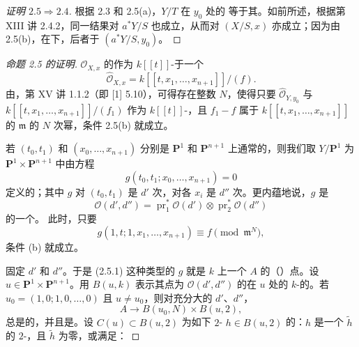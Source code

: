 \begin{proof}[证明 $2.5\Rightarrow2.4$]
根据 2.3 和 2.5(a)，$Y/T$ 在 $y_0$ 处的 等于其。如前所述，根据第 XIII 讲 2.4.2，同一结果对 $a^*Y/S$ 也成立，从而对 $(X/S,x)$ 亦成立；因为由 2.5(b)，在下，后者于 $(a^*Y/S,y_0)$。
\end{proof}

\begin{proof}[命题 2.5 的证明]
 $\mathscr O_{X,x}$ 的作为 $k[[t]]$-于一个
\[
\widehat{\mathscr O}_{X,x}=k[[t,x_1,\ldots,x_{n+1}]]/(f).
\]
由，第 XV 讲 1.1.2（即 [1]  5.10），可得存在整数 $N$，使得只要 $\widehat{\mathscr O}_{Y,y_0}$ 与 $k[[t,x_1,\ldots,x_{n+1}]]/(f_1)$ 作为 $k[[t]]$-，且 $f_1-f$ 属于 $k[[t,x_1,\ldots,x_{n+1}]]$ 的 $\mathfrak m$ 的 $N$ 次幂，条件 2.5(b) 就成立。

若 $(t_0,t_1)$ 和 $(x_0,\ldots,x_{n+1})$ 分别是 $\mathbf P^1$ 和 $\mathbf P^{n+1}$ 上通常的，则我们取 $Y/\mathbf P^1$ 为 $\mathbf P^1\times\mathbf P^{n+1}$ 中由方程
\[
g(t_0,t_1;x_0,\ldots,x_{n+1})=0
\tag{2.5.1}
\]
定义的；其中 $g$ 对 $(t_0,t_1)$ 是 $d'$ 次，对各 $x_i$ 是 $d''$ 次。更内蕴地说，$g$ 是
\[
\mathscr O(d',d'')=\operatorname{pr}_1^*\mathscr O(d')\otimes\operatorname{pr}_2^*\mathscr O(d'')
\]
的一个。
此时，只要
\[
g(1,t;1,x_1,\ldots,x_{n+1})\equiv f\pmod{\mathfrak m^N},
\tag{2.5.2}
\]
条件 (b) 就成立。

固定 $d'$ 和 $d''$。于是 (2.5.1) 这种类型的 $g$ 就是 $k$ 上一个 $A$ 的（）点。设 $u\in\mathbf P^1\times\mathbf P^{n+1}$。用 $B(u,k)$ 表示其点为 $\mathscr O(d',d'')$ 的在 $u$ 处的 $k$-的。若 $u_0=(1,0;1,0,\ldots,0)$ 且 $u\ne u_0$，则对充分大的 $d'$、$d''$，
\[
A\longrightarrow B(u_0,N)\times B(u,2),
\tag{2.5.3}
\]
总是的，并且是。设 $C(u)\subset B(u,2)$ 为如下 $2$- $h\in B(u,2)$ 的：$h$ 是一个 $\widetilde h$ 的 $2$-，且 $\widetilde h$ 为零，或满足：


\end{proof}
